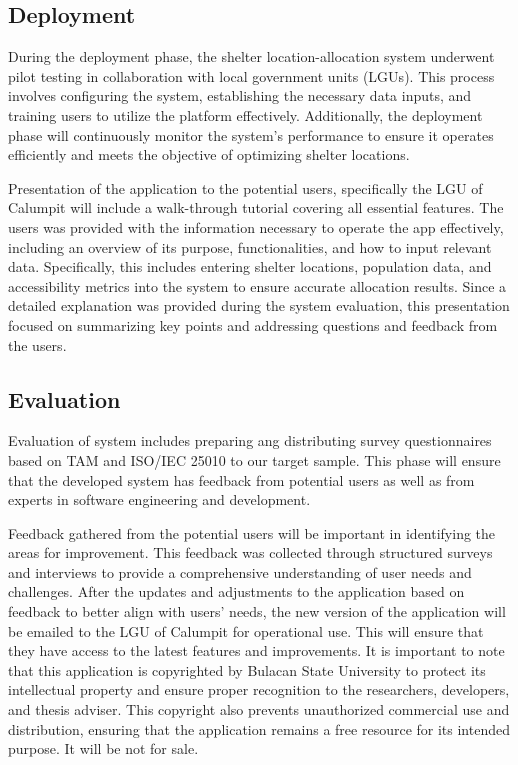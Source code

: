 \subsection{Deployment}
	During the deployment phase, the shelter location-allocation system underwent pilot testing in collaboration with local government units (LGUs). This process involves configuring the system, establishing the necessary data inputs, and training users to utilize the platform effectively. Additionally, the deployment phase will continuously monitor the system's performance to ensure it operates efficiently and meets the objective of optimizing shelter locations. 

	Presentation of the application to the potential users, specifically the LGU of Calumpit will include a walk-through tutorial covering all essential features. The users was provided with the information necessary to operate the app effectively, including an overview of its purpose, functionalities, and how to input relevant data. Specifically, this includes entering shelter locations, population data, and accessibility metrics into the system to ensure accurate allocation results. Since a detailed explanation was provided during the system evaluation, this presentation focused on summarizing key points and addressing questions and feedback from the users.
	
\subsection{Evaluation}
	Evaluation of system includes preparing ang distributing survey questionnaires based on TAM and ISO/IEC 25010 to our target sample. This phase will ensure that the developed system has feedback from potential users as well as from experts in software engineering and development.
	
	Feedback gathered from the potential users will be important in identifying the areas for improvement. This feedback was collected through structured surveys and interviews to provide a comprehensive understanding of user needs and challenges. After the updates and adjustments to the application based on feedback to better align with users’ needs, the new version of the application will be emailed to the LGU of Calumpit for operational use. This will ensure that they have access to the latest features and improvements. It is important to note that this application is copyrighted by Bulacan State University to protect its intellectual property and ensure proper recognition to the researchers, developers, and thesis adviser. This copyright also prevents unauthorized commercial use and distribution, ensuring that the application remains a free resource for its intended purpose. It will be not for sale.

